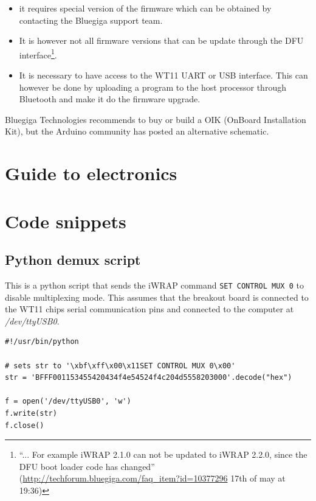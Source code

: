 \documentclass[a4paper, oneside, final]{memoir}
\begin{document}
\begin{itemize}
\item it requires special version of the firmware which can be obtained by
  contacting the Bluegiga support team.

\item It is however not all firmware versions that can be update through the DFU
  interface\footnote{``... For example iWRAP 2.1.0 can not be updated to iWRAP
    2.2.0, since the DFU boot loader code has changed''
    (\url{http://techforum.bluegiga.com/faq_item?id=10377296} 17th of may at
    19:36)}.

\item It is necessary to have access to the WT11 UART or USB
  interface. This can however be done by uploading a program to the host
  processor through Bluetooth and make it do the firmware upgrade.
\end{itemize}

Bluegiga Technologies recommends to buy or build\cite{oik_chematic} a OIK
(OnBoard Installation Kit), but the Arduino community has posted an
alternative schematic\cite{oik_chematic_arduino}.


\chapter{Guide to electronics}


\chapter{Code snippets}

\section{Python demux script}
\label{sec:python-demux-script}

This is a python script that sends the iWRAP command \texttt{SET CONTROL MUX 0}
to disable multiplexing mode. This assumes that the breakout board is connected
to the WT11 chips serial communication pins and connected to the computer at
\textit{/dev/ttyUSB0}.

\begin{verbatim}
#!/usr/bin/python

# sets str to '\xbf\xff\x00\x11SET CONTROL MUX 0\x00'
str = 'BFFF001153455420434f4e54524f4c204d5558203000'.decode("hex")

f = open('/dev/ttyUSB0', 'w')
f.write(str)
f.close()
\end{verbatim}
\end{document}
